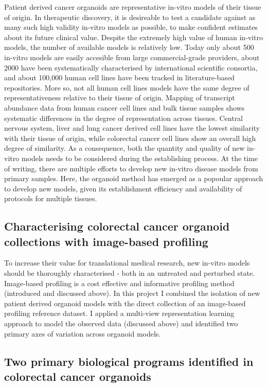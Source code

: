 \begin{flushleft}
Patient derived cancer organoids are representative in-vitro models of their tissue of origin. In therapeutic discovery, it is desireable to test a candidate against as many such high validity in-vitro models as possible, to make confident estimates about its future clinical value. Despite the extremely high value of human in-vitro models, the number of available models is relatively low. Today only about 500 in-vitro models are easily accesible from large commercial-grade providers, about 2000 have been systematically characterised by international scientific consortia, and about 100,000 human cell lines have been tracked in literature-based repositories. More so, not all human cell lines models have the same degree of representativeness relative to their tissue of origin. Mapping of transcript abundance data from human cancer cell lines and bulk tissue samples shows systematic differences in the degree of representation across tissues. Central nervous system, liver and lung cancer derived cell lines have the lowest similarity with their tissue of origin, while colorectal cancer cell lines show an overall high degree of similarity. As a consequence, both the quantity and quality of new in-vitro models needs to be considered during the establishing process. At the time of writing, there are multiple efforts to develop new in-vitro disease models from primary samples. Here, the organoid method has emerged as a popoular approach to develop new models, given its establishment efficiency and availability of protocols for multiple tissues. 
\bigbreak

\subsection{Characterising colorectal cancer organoid collections with image-based profiling}

To increase their value for translational medical research, new in-vitro models should be thoroughly characterised - both in an untreated and perturbed state. Image-based profiling is a cost effective and informative profiling method (introduced and discussed above). In this project I combined the isolation of new patient derived organoid models with the direct collection of an image-based profiling reference dataset. I applied a multi-view representation learning approach to model the observed data (discussed above) and identified two primary axes of variation across organoid models. 
\bigbreak

\subsection{Two primary biological programs identified in colorectal cancer organoids}


\end{flushleft}
